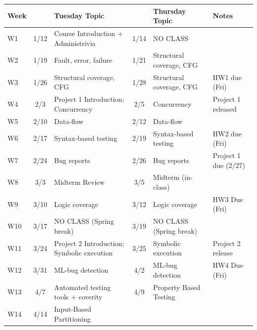 \documentclass[letterpaper,11pt]{article}
\begin{document}
\begin{tabular}{l|cp{}|cp{}|l}
  \textbf{Week} & & \textbf{Tuesday Topic} && \textbf{Thursday Topic}
  & \textbf{Notes} \\ \hline\hline
  W1 & 	1/12 & Course Introduction + Administrivia
                                           & 1/14 & NO CLASS &	\\ \hline
  W2 & 	1/19 & 	Fault, error, failure
                                           & 1/21 &	Structural
                                                    coverage, CFG 	\\  \hline
  W3 & 	1/26 & 	Structural coverage, CFG
                                           & 1/28 & Structural coverage, CFG
     & HW1 due (Fri) \\  \hline
  W4 	& 2/3 & Project 1 Introduction; Concurrency
                                           & 2/5& 	Concurrency
     &	Project 1 released \\ \hline
  W5 	& 2/10 & 	Data-flow
                                           & 2/12& 	Data-flow
     &	 \\  \hline
  W6 	& 2/17 & Syntax-based testing
                                           & 2/19& 	Syntax-based
                                                   testing
     & 	HW2 due (Fri) \\  \hline
  W7 	& 2/24 & 	Bug reports
                                           & 2/26& 	Bug reports & 	Project 1 due (2/27)\\  \hline
  W8 	& 3/3 & Midterm Review
                                           & 3/5& 	Midterm (in-class) & \\  \hline
  W9 	& 3/10 & 	Logic coverage
                                           & 3/12 & Logic coverage
     & HW3 Due (Fri) \\  \hline
  W10 	& 3/17 & 	NO CLASS (Spring break)
                                           & 3/19 & NO CLASS (Spring break) 	 \\  \hline
  W11 	& 3/24 & 	Project 2 Introduction; Symbolic execution
                                           & 3/25& Symbolic execution & 	Project 2 release \\  \hline
  W12 	& 3/31 & 	ML-bug detection
                                           & 4/2& ML-bug detection
     & 	HW4 Due (Fri) \\\hline
  W13 	& 4/7 & 	Automated testing tools + coverity
                                           & 4/9& Property Based Testing
     & \\\hline
  W14 	& 4/14 & Input-Based
                                                   Partitioning


\end{tabular}
\end{document}
